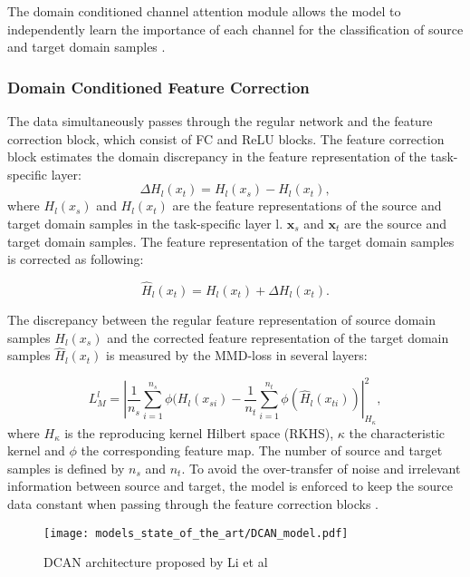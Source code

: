 The domain conditioned channel attention module allows the model to independently learn the importance of each channel for the classification of source and target domain samples \cite{li2020}.


\subsubsection{Domain Conditioned Feature Correction}
The data simultaneously passes through the regular network and the feature correction block, which consist of FC and ReLU blocks. The feature correction block estimates the domain discrepancy in the feature representation of the task-specific layer:
\begin{equation}
    \Delta H_{l}(x_{t}) = H_{l}(x_{s}) - H_{l}(x_{t}),
\end{equation}
where $H_{l}(x_{s})$ and $H_{l}(x_{t})$ are the feature representations of the source and target domain samples in the task-specific layer l. $\pmb{x}_{s}$ and $\pmb{x}_{t}$ are the source and target domain samples. The feature representation of the target domain samples is corrected as following:

\begin{equation}
    \hat{H}_{l}(x_{t}) = H_{l}(x_{t}) + \Delta H_{l}(x_{t}).
\end{equation}

The discrepancy between the regular feature representation of source domain samples $H_{l}(x_{s})$ and the corrected feature representation of the target domain samples $\hat{H}_{l}(x_{t})$ is measured by the MMD-loss in several layers:

\begin{equation}
    L_{M}^{l} = |\frac{1}{n_s} \sum_{i=1}^{n_{s}} \phi(H_{l}(x_{si}) - \frac{1}{n_t} \sum_{i=1}^{n_{t}} \phi(\hat{H}_{l}(x_{ti}))|_{H_{\kappa}}^{2}, 
\end{equation}
where $H_{\kappa}$ is the reproducing kernel Hilbert space (RKHS), $\kappa$ the characteristic kernel and $\phi$ the corresponding feature map. The number of source and target samples is defined by $n_{s}$ and $n_{t}$. To avoid the over-transfer of noise and irrelevant information between source and target, the model is enforced to keep the source data constant when passing through the feature correction blocks \cite{li2020}.

\begin{figure}[H]
  \centering
  \texttt{[image: models\_state\_of\_the\_art/DCAN\_model.pdf]}
  \caption{DCAN architecture proposed by Li et al \cite{li2020}}
  \label{fig:DCAN_model}
\end{figure}

